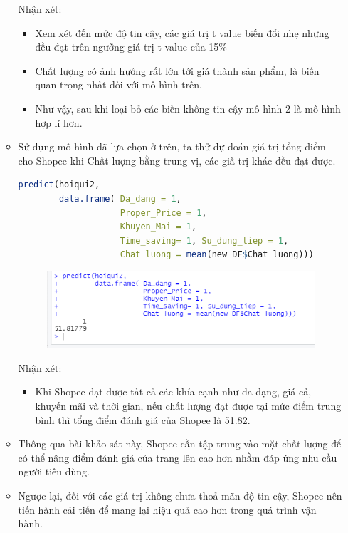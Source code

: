 \documentclass[a4paper]{article}
\theoremstyle{definition}
\begin{document}
\begin{itemize}
\begin{itemize}
\begin{figure}[H]
            \label{fig:my_label}
        \end{figure}
        Nhận xét: 
        \begin{itemize}
            \item Xem xét đến mức độ tin cậy, các giá trị t value biến đổi nhẹ nhưng đều đạt trên ngưỡng giá trị t value của 15\%
            \item Chất lượng có ảnh hưởng rất lớn tới giá thành sản phẩm, là biến quan trọng nhất đối với mô hình trên.
            \item Như vậy, sau khi loại bỏ các biến không tin cậy mô hình 2  là mô hình hợp lí hơn.\\
        \end{itemize}
 \item Sử dụng mô hình đã lựa chọn ở trên, ta thử dự đoán giá trị tổng điểm cho Shopee khi Chất lượng bằng trung vị, các giấ trị khác đều đạt được.
    \begin{lstlisting}[language=R, caption=Mô hình dữ liệu (tiếp theo)]
predict(hoiqui2,
        data.frame( Da_dang = 1,
                    Proper_Price = 1,
                    Khuyen_Mai = 1,
                    Time_saving= 1, Su_dung_tiep = 1,
                    Chat_luong = mean(new_DF$Chat_luong)))
    \end{lstlisting}
    
    
    \begin{figure}[H]
            \centering
            \includegraphics[scale=1]{predict.png}
            \label{fig:my_label}
        \end{figure}
    Nhận xét: \\
    \begin{itemize}
        \item Khi Shopee đạt được tất cả các khía cạnh như đa dạng, giá cả, khuyến mãi và thời gian, nếu chất lượng đạt được tại mức điểm trung bình thì tổng điểm đánh giá của Shopee là 51.82. 
    \end{itemize}
\item Thông qua bài khảo sát này, Shopee cần tập trung vào mặt chất lượng để có thể nâng điểm đánh giá của trang lên cao hơn nhằm đáp ứng nhu cầu người tiêu dùng.\\
\item Ngược lại, đối với các giá trị không chưa thoả mãn độ tin cậy, Shopee nên tiến hành cải tiến để mang lại hiệu quả cao hơn trong quá trình vận hành.\\
    

\end{itemize}
\end{itemize}
\end{document}
